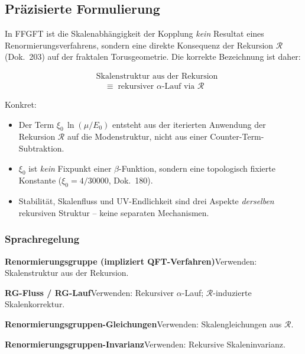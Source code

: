 \subsection*{Präzisierte Formulierung}

In FFGFT ist die Skalenabhängigkeit der Kopplung \emph{kein} Resultat
eines Renormierungsverfahrens, sondern eine direkte Konsequenz der
Rekursion $\mathcal{R}$ (Dok.~203) auf der fraktalen Torusgeometrie.
Die korrekte Bezeichnung ist daher:

\begin{equation}
  \boxed{\;
  \begin{aligned}
    &\text{Skalenstruktur aus der Rekursion} \\
    &\quad\equiv\; \text{rekursiver $\alpha$-Lauf via $\mathcal{R}$}
  \end{aligned}
  \;}
  \tag{190.12}
\end{equation}

Konkret:
\begin{itemize}
  \item Der Term $\xi_0\,\ln(\mu/E_0)$ entsteht aus der iterierten
        Anwendung der Rekursion $\mathcal{R}$ auf die Modenstruktur,
        nicht aus einer Counter-Term-Subtraktion.
  \item $\xi_0$ ist \emph{kein} Fixpunkt einer $\beta$-Funktion,
        sondern eine topologisch fixierte Konstante
        ($\xi_0 = 4/30000$, Dok.~180).
  \item Stabilität, Skalenfluss und UV-Endlichkeit sind drei Aspekte
        \emph{derselben} rekursiven Struktur -- keine separaten
        Mechanismen.
\end{itemize}

\subsubsection*{Sprachregelung}

\smallskip\noindent \textbf{Renormierungsgruppe (impliziert QFT-Verfahren)}\quad Verwenden: Skalenstruktur aus der Rekursion.

\smallskip\noindent \textbf{RG-Fluss / RG-Lauf}\quad Verwenden: Rekursiver $\alpha$-Lauf; $\mathcal{R}$-induzierte Skalenkorrektur.

\smallskip\noindent \textbf{Renormierungsgruppen-Gleichungen}\quad Verwenden: Skalengleichungen aus $\mathcal{R}$.

\smallskip\noindent \textbf{Renormierungsgruppen-Invarianz}\quad Verwenden: Rekursive Skaleninvarianz.

